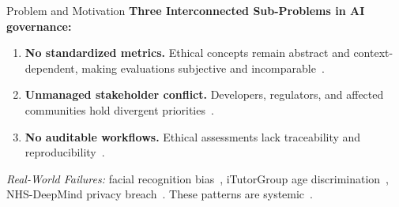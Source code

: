 \begin{frame}{Problem and Motivation}
    \textbf{Three Interconnected Sub-Problems in AI governance:}
    \begin{enumerate}
        \item \textbf{No standardized metrics.} Ethical concepts remain abstract and context-dependent, making evaluations subjective and incomparable~\cite{mittelstadt2019principles}.
        \item \textbf{Unmanaged stakeholder conflict.} Developers, regulators, and affected communities hold divergent priorities~\cite{freeman1984strategic, mitchell1997stakeholder}.
        \item \textbf{No auditable workflows.} Ethical assessments lack traceability and reproducibility~\cite{hagendorff2020ethics}.
    \end{enumerate}

    \vspace{6pt}
    \textit{Real-World Failures:} facial recognition bias~\cite{buolamwini2018gender}, iTutorGroup age discrimination~\cite{eeoc2022itutorgroup}, NHS-DeepMind privacy breach~\cite{ico2017deepmind}. These patterns are systemic~\cite{oneil2016weapons, raji2020closing}.
\end{frame}

